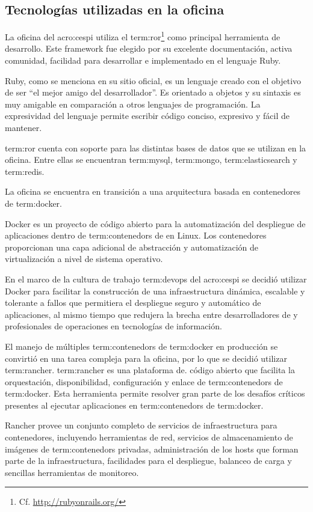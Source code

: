 \subsection{Tecnologías utilizadas en la oficina}
\label{tecnologias_utilizadas}

La oficina del \gls{acro:cespi} utiliza el  
\gls{term:ror}\footnote{Cf.  \url{http://rubyonrails.org/}} como principal
herramienta de desarrollo. Este framework fue elegido por su excelente
documentación, activa comunidad, facilidad para desarrollar e implementado en
el lenguaje Ruby.

Ruby, como se menciona en su sitio oficial, es un lenguaje creado con el
objetivo de ser “el mejor amigo del desarrollador”. Es orientado a objetos y su
sintaxis es muy amigable en comparación a otros lenguajes de programación. La
expresividad del lenguaje permite escribir código conciso, expresivo y fácil de
mantener.

\gls{term:ror} cuenta con soporte para las distintas bases de datos que se
utilizan en la oficina. Entre ellas se encuentran \gls{term:mysql},
\gls{term:mongo}, \gls{term:elasticsearch} y \gls{term:redis}.

La oficina se encuentra en transición a una arquitectura basada en contenedores
de \gls{term:docker}.

Docker es un proyecto de código abierto para la automatización del despliegue
de aplicaciones dentro de \glspl{term:contenedor} de  en Linux.
Los contenedores proporcionan una capa adicional de abstracción y
automatización de virtualización a nivel de sistema operativo.

En el marco de la cultura de trabajo \gls{term:devops} del \gls{acro:cespi} se
decidió utilizar Docker para facilitar la construcción de una infraestructura
dinámica, escalable y tolerante a fallos que permitiera el despliegue seguro y
automático de aplicaciones, al mismo tiempo que redujera la brecha entre
desarrolladores de  y profesionales de operaciones en tecnologías
de información.

El manejo de múltiples \glspl{term:contenedor} de \gls{term:docker} en
producción se convirtió en una tarea compleja para la oficina, por lo que se
decidió utilizar \gls{term:rancher}. \gls{term:rancher} es una plataforma de.
código abierto que facilita la orquestación, disponibilidad, configuración y
enlace de \glspl{term:contenedor} de \gls{term:docker}. Esta herramienta
permite resolver gran parte de los desafíos críticos presentes al ejecutar
aplicaciones en \glspl{term:contenedor} de \gls{term:docker}.

Rancher provee un conjunto completo de servicios de infraestructura para
contenedores, incluyendo herramientas de red, servicios de almacenamiento de
imágenes de \glspl{term:contenedor} privadas, administración de los hosts que forman parte
de la infraestructura, facilidades para el despliegue, balanceo de carga y
sencillas herramientas de monitoreo.
